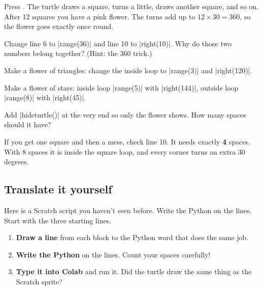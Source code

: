Press \playbtn. The turtle draws a square, turns a little, draws another square, and so on. After 12 squares you have a pink flower. The turns add up to $12 \times 30 = 360$, so the flower goes exactly once round.


\begin{challenge}
\tick Change line 6 to \py|range(36)| and line 10 to \py|right(10)|. Why do those two numbers belong together? (Hint: the 360 trick.)\par
\tick Make a flower of triangles: change the inside loop to \py|range(3)| and \py|right(120)|.\par
\tick Make a flower of stars: inside loop \py|range(5)| with \py|right(144)|, outside loop \py|range(8)| with \py|right(45)|.\par
\tick Add \py|hideturtle()| at the very end so only the flower shows. How many spaces should it have?
\end{challenge}

\begin{watchout}
If you get one square and then a mess, check line 10. It needs exactly \textbf{4} spaces. With 8 spaces it is inside the square loop, and every corner turns an extra 30 degrees.
\end{watchout}

\clearpage
\subsection*{Translate it yourself}

Here is a Scratch script you haven't seen before. Write the Python on the lines. Start with the three starting lines.

\begin{enumerate}
  \item \textbf{Draw a line} from each block to the Python word that does the same job.
  \item \textbf{Write the Python} on the lines. Count your spaces carefully!
  \item \textbf{Type it into Colab} and run it. Did the turtle draw the same thing as the Scratch sprite?
\end{enumerate}

